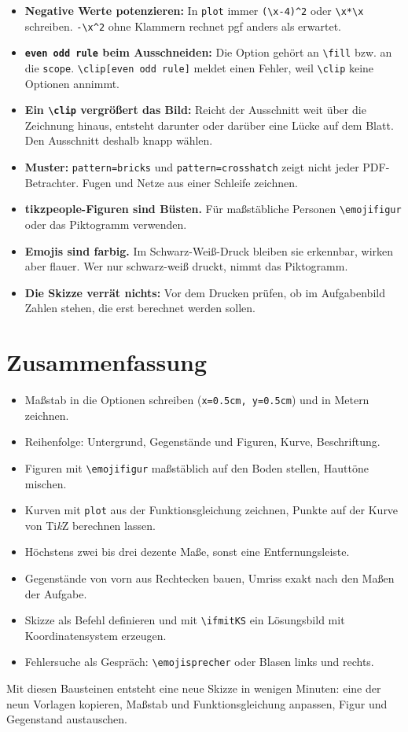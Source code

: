 \begin{itemize}
	\item \textbf{Negative Werte potenzieren:} In \texttt{plot} immer \texttt{(\textbackslash x-4)\textasciicircum 2} oder \texttt{\textbackslash x*\textbackslash x} schreiben. \texttt{-\textbackslash x\textasciicircum 2} ohne Klammern rechnet pgf anders als erwartet.
	\item \textbf{\texttt{even odd rule} beim Ausschneiden:} Die Option gehört an \texttt{\textbackslash fill} bzw. an die \texttt{scope}. \texttt{\textbackslash clip[even odd rule]} meldet einen Fehler, weil \texttt{\textbackslash clip} keine Optionen annimmt.
	\item \textbf{Ein \texttt{\textbackslash clip} vergrößert das Bild:} Reicht der Ausschnitt weit über die Zeichnung hinaus, entsteht darunter oder darüber eine Lücke auf dem Blatt. Den Ausschnitt deshalb knapp wählen.
	\item \textbf{Muster:} \texttt{pattern=bricks} und \texttt{pattern=crosshatch} zeigt nicht jeder PDF-Betrachter. Fugen und Netze aus einer Schleife zeichnen.
	\item \textbf{tikzpeople-Figuren sind Büsten.} Für maßstäbliche Personen \texttt{\textbackslash emojifigur} oder das Piktogramm verwenden.
	\item \textbf{Emojis sind farbig.} Im Schwarz-Weiß-Druck bleiben sie erkennbar, wirken aber flauer. Wer nur schwarz-weiß druckt, nimmt das Piktogramm.
	\item \textbf{Die Skizze verrät nichts:} Vor dem Drucken prüfen, ob im Aufgabenbild Zahlen stehen, die erst berechnet werden sollen.
\end{itemize}



\section{Zusammenfassung}

\begin{itemize}
	\item Maßstab in die Optionen schreiben (\texttt{x=0.5cm, y=0.5cm}) und in Metern zeichnen.
	\item Reihenfolge: Untergrund, Gegenstände und Figuren, Kurve, Beschriftung.
	\item Figuren mit \texttt{\textbackslash emojifigur} maßstäblich auf den Boden stellen, Hauttöne mischen.
	\item Kurven mit \texttt{plot} aus der Funktionsgleichung zeichnen, Punkte auf der Kurve von Ti\textit{k}Z berechnen lassen.
	\item Höchstens zwei bis drei dezente Maße, sonst eine Entfernungsleiste.
	\item Gegenstände von vorn aus Rechtecken bauen, Umriss exakt nach den Maßen der Aufgabe.
	\item Skizze als Befehl definieren und mit \texttt{\textbackslash ifmitKS} ein Lösungsbild mit Koordinatensystem erzeugen.
	\item Fehlersuche als Gespräch: \texttt{\textbackslash emojisprecher} oder Blasen links und rechts.
\end{itemize}

Mit diesen Bausteinen entsteht eine neue Skizze in wenigen Minuten: eine der neun Vorlagen kopieren, Maßstab und Funktionsgleichung anpassen, Figur und Gegenstand austauschen.


